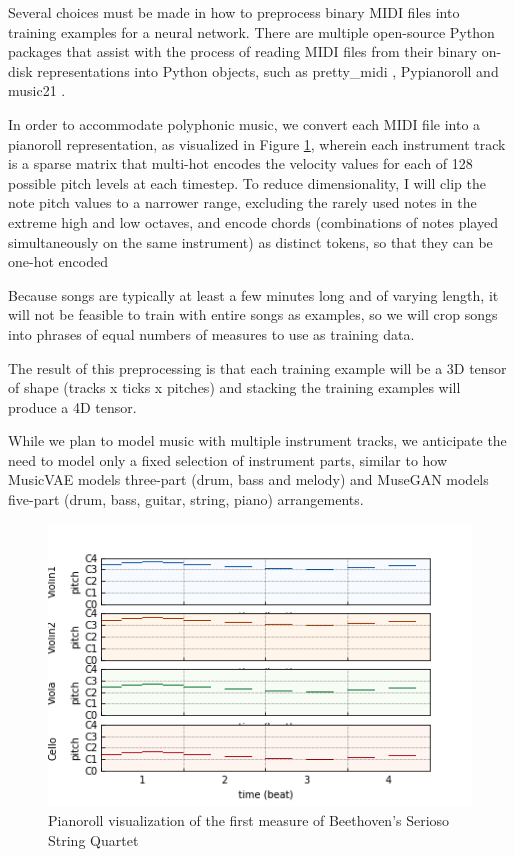 \documentclass[sigconf,authorversion]{acmart}
\begin{document}
Several choices must be made in how to preprocess binary MIDI files
into training examples for a neural network. There are multiple
open-source Python packages that assist with the process of reading
MIDI files from their binary on-disk representations into Python
objects, such as pretty\_midi \cite{raffel_pretty_midi_2014},
Pypianoroll \cite{dong_pypianoroll_2018} and music21
\cite{cuthbert_music21_2010}.

In order to accommodate polyphonic music, we convert each MIDI file
into a pianoroll representation, as visualized in Figure
\ref{pianoroll}, wherein each instrument track is a sparse matrix that
multi-hot encodes the velocity values for each of 128 possible pitch
levels at each timestep. To reduce dimensionality, I will clip the
note pitch values to a narrower range, excluding the rarely used notes
in the extreme high and low octaves, and encode chords (combinations
of notes played simultaneously on the same instrument) as distinct
tokens, so that they can be one-hot encoded

Because songs are typically at least a few minutes long and of varying
length, it will not be feasible to train with entire songs as
examples, so we will crop songs into phrases of equal numbers of
measures to use as training data.

The result of this preprocessing is that each training example will be
a 3D tensor of shape (tracks x ticks x pitches) and stacking the
training examples will produce a 4D tensor.

While we plan to model music with multiple instrument tracks, we
anticipate the need to model only a fixed selection of instrument
parts, similar to how MusicVAE models three-part (drum, bass and
melody) \cite{roberts_hierarchical_2018} and MuseGAN models five-part
(drum, bass, guitar, string, piano) arrangements.

\begin{figure}[h]
  \centering
  \includegraphics[width=\linewidth]{first_bar.png}
  \caption{Pianoroll visualization of the first measure of
    Beethoven's Serioso String Quartet}
  \label{pianoroll}
\end{figure}
\end{document}
